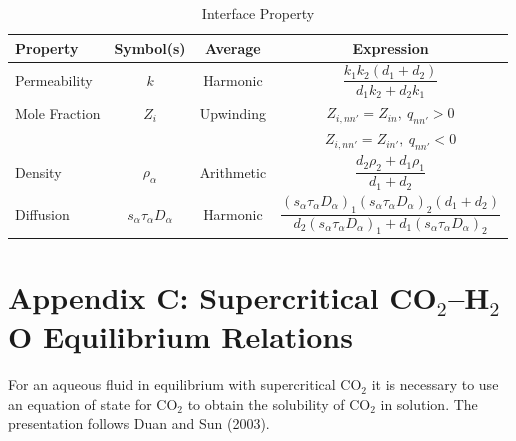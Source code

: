 \documentclass[12pt]{article}
\renewcommand{\a}{{\alpha}}
\begin{document}
\begin{table}[h]\centering
\caption{Interface Property}\label{tinterface}

\vspace{3mm}

\renewcommand{\arraystretch}{2}
\begin{tabular}{lccc}
\toprule
Property & Symbol(s) & Average & Expression\\
\midrule
Permeability & $k$ & Harmonic & $\dfrac{k_1 k_2(d_1+d_2)}{d_1 k_2 + d_2 k_1}$\\
\midrule
Mole Fraction & $Z_i$ & Upwinding & $Z_{i,nn'} = Z_{in}, \ q_{nn'}>0$\\
&&&$Z_{i,nn'} = Z_{in'}, \ q_{nn'}<0$ \\
\midrule
Density & $\rho_\a$ & Arithmetic & $\dfrac{d_2\rho_2 + d_1\rho_1}{d_1+d_2}$\\
\midrule
Diffusion & $s_\a\tau_\a D_\a$ & Harmonic & $\dfrac{(s_\a\tau_\a D_\a)_1(s_\a\tau_\a D_\a)_2 (d_1+d_2)}{d_2(s_\a\tau_\a D_\a)_1 + d_1(s_\a\tau_\a D_\a)_2}$\\
\bottomrule
\end{tabular}
\end{table}


\section*{Appendix C: Supercritical CO$_2$--H$_2$O Equilibrium Relations}
\label{sec:eqrel}
\renewcommand{\theequation}{C-\arabic{equation}}
\setcounter{equation}{0}

For an aqueous fluid in equilibrium with supercritical CO$_2$ it is necessary to use an equation of state for CO$_2$ to obtain the solubility of CO$_2$ in solution. The presentation follows Duan and Sun (2003). 
\end{document}
